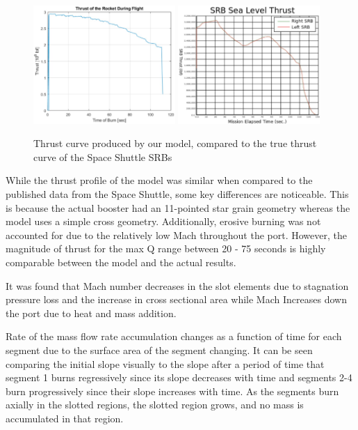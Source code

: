 \begin{figure}
    \centering
    \includegraphics[width=0.48\textwidth]{images/combustion-thrust-v-time}
    \hfill
    \includegraphics[width=0.48\textwidth]{images/srb-thrustcurve}
    \caption{Thrust curve produced by our model, compared to the true thrust curve of the Space Shuttle SRBs}
    \label{figure:thrustcurve-comparison}
\end{figure}

While the thrust profile of the model was similar when compared to the published data from the Space Shuttle, some key differences are noticeable. This is because the actual booster had an 11-pointed star grain geometry whereas the model uses a simple cross geometry. Additionally, erosive burning was not accounted for due to the relatively low Mach throughout the port. However, the magnitude of thrust for the max Q range between 20 - 75 seconds is highly comparable between the model and the actual results.

It was found that Mach number decreases in the slot elements due to stagnation pressure loss and the increase in cross sectional area while Mach Increases down the port due to heat and mass addition.

Rate of the mass flow rate accumulation changes as a function of time for each segment due to the surface area of the segment changing. It can be seen comparing the initial slope visually to the slope after a period of time that segment 1 burns regressively since its slope decreases with time and segments 2-4 burn progressively since their slope increases with time. As the segments burn axially in the slotted regions, the slotted region grows, and no mass is accumulated in that region.
\pagebreak

